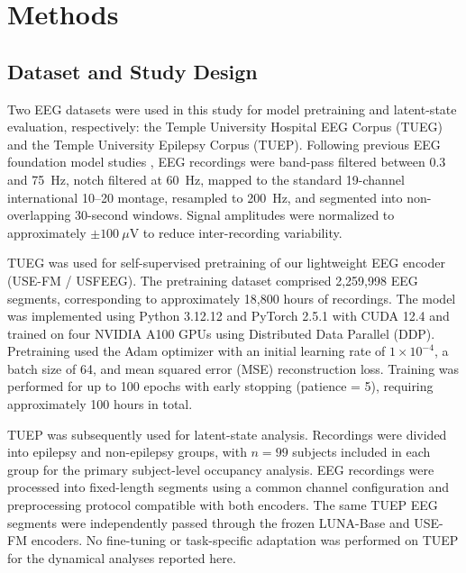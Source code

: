 
\section{Methods}

\subsection{Dataset and Study Design}

Two EEG datasets were used in this study for model pretraining and latent-state
evaluation, respectively: the Temple University Hospital EEG Corpus (TUEG) and
the Temple University Epilepsy Corpus (TUEP). Following previous EEG foundation
model studies \cite{zhou2026csbrain,jiang2024large,wang2025cbramod}, EEG
recordings were band-pass filtered between 0.3 and 75~Hz, notch filtered at
60~Hz, mapped to the standard 19-channel international 10--20 montage,
resampled to 200~Hz, and segmented into non-overlapping 30-second windows.
Signal amplitudes were normalized to approximately $\pm100~\mu$V to reduce
inter-recording variability.

TUEG was used for self-supervised pretraining of our lightweight EEG encoder
(USE-FM / USFEEG). The pretraining dataset comprised 2,259,998 EEG segments,
corresponding to approximately 18,800 hours of recordings. The model was
implemented using Python 3.12.12 and PyTorch 2.5.1 with CUDA 12.4 and trained
on four NVIDIA A100 GPUs using Distributed Data Parallel (DDP). Pretraining
used the Adam optimizer with an initial learning rate of $1\times10^{-4}$, a
batch size of 64, and mean squared error (MSE) reconstruction loss. Training
was performed for up to 100 epochs with early stopping (patience = 5),
requiring approximately 100 hours in total.

TUEP was subsequently used for latent-state analysis. Recordings were divided
into epilepsy and non-epilepsy groups, with $n=99$ subjects included in each
group for the primary subject-level occupancy analysis. EEG recordings were
processed into fixed-length segments using a common channel configuration and
preprocessing protocol compatible with both encoders. The same TUEP EEG
segments were independently passed through the frozen LUNA-Base and USE-FM
encoders. No fine-tuning or task-specific adaptation was performed on TUEP for
the dynamical analyses reported here.

